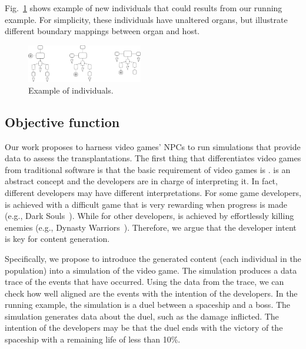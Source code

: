 Fig.~\ref{fig:candidates} shows example of new individuals that could results from our running example. For simplicity, these individuals have unaltered organs, but illustrate different boundary mappings between organ and host.

\begin{figure}[h]
    \centering
    \includegraphics[width=0.45\textwidth]{Figures/candidates.png}
    \caption{Example of individuals.}
    \label{fig:candidates}
\end{figure}

\subsection{Objective function}

Our work proposes to harness video games' NPCs to run simulations that provide data to assess the transplantations. The first thing that differentiates video games from traditional software is that the basic requirement of video games is .  is an abstract concept and the developers are in charge of interpreting it. In fact, different developers may have different interpretations. For some game developers,  is achieved with a difficult game that is very rewarding when progress is made (e.g., Dark Souls~\cite{darksouls}). While for other developers,  is achieved by effortlessly killing enemies (e.g., Dynasty Warriors~\cite{dynastywarriors}). Therefore, we argue that the developer intent is key for content generation.

Specifically, we propose to introduce the generated content (each individual in the population) into a simulation of the video game. The simulation produces a data trace of the events that have occurred. Using the data from the trace, we can check how well aligned are the events with the intention of the developers. In the running example, the simulation is a duel between a spaceship and a boss. The simulation generates data about the duel, such as the damage inflicted. The intention of the developers may be that the duel ends with the victory of the spaceship with a remaining life of less than 10\%.

